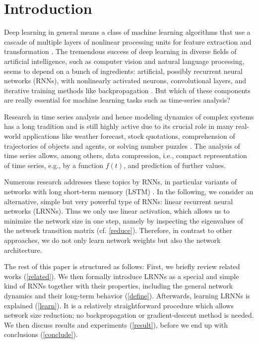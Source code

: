 \documentclass[twoside,11pt]{article}
\theoremstyle{definition}
\begin{document}
\section{Introduction}

Deep learning in general means a class of machine learning algorithms that use a
cascade of multiple layers of nonlinear processing units for feature extraction
and transformation \citep{DY14}. The tremendous success of deep learning in
diverse fields of artificial intelligence, such as computer vision and natural
language processing, seems to depend on a bunch of ingredients: artificial,
possibly recurrent neural networks (RNNs), with nonlinearly activated neurons,
convolutional layers, and iterative training methods like backpropagation
\citep{GBC16}. But which of these components are really essential for machine
learning tasks such as time-series analysis?

Research in time series analysis and hence modeling dynamics of complex systems
has a long tradition and is still highly active due to its crucial role in many
real-world applications \citep{LBE15} like weather forecast, stock quotations,
comprehension of trajectories of objects and agents, or solving number puzzles
\citep{RK11,GW13}. The analysis of time series allows, among others, data
compression, i.e., compact representation of time series, e.g., by a function
$f(t)$, and prediction of further values.

Numerous research addresses these topics by RNNs, in particular variants of
networks with long short-term memory (LSTM) \citep{HS97}. In the following, we
consider an alternative, simple but very powerful type of RNNs: linear
recurrent neural networks (LRNNs). Thus we only use linear activation, which
allows us to minimize the network size in one step, namely by inspecting the
eigenvalues of the network transition matrix (cf. \cref{reduce}). Therefore, in
contrast to other approaches, we do not only learn network weights but also the
network architecture.

The rest of this paper is structured as follows: First, we briefly review related
works (\cref{related}). We then formally introduce LRNNs as a special and simple
kind of RNNs together with their properties, including the general network
dynamics and their long-term behavior (\cref{define}). Afterwards, learning
LRNNs is explained (\cref{learn}). It is a relatively straightforward procedure
which allows network size reduction; no backpropagation or gradient-descent
method is needed. We then discuss results and experiments (\cref{result}),
before we end up with conclusions (\cref{conclude}).
\end{document}
